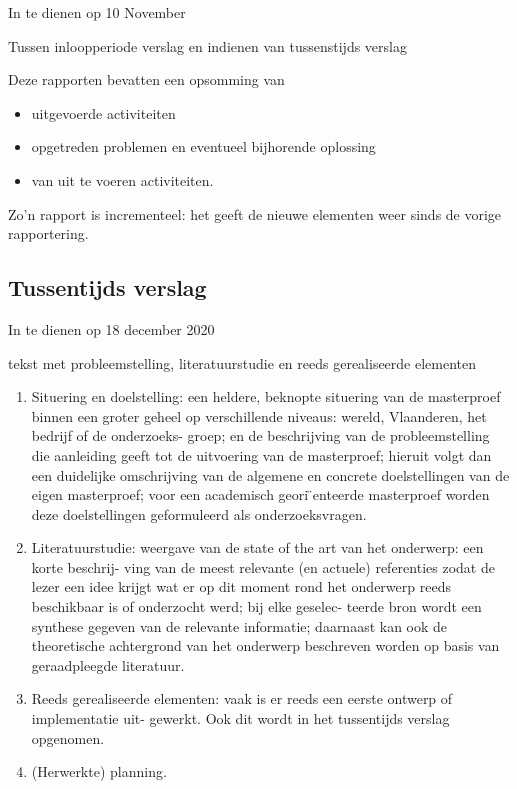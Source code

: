 \documentclass{scrartcl}
\begin{document}
In te dienen op 10 November



Tussen inloopperiode verslag en indienen van tussenstijds verslag

Deze rapporten bevatten een opsomming van 

\begin{itemize}
\item uitgevoerde activiteiten
\item opgetreden problemen en eventueel bijhorende oplossing
\item van uit te voeren activiteiten.
\end{itemize}
Zo’n rapport is incrementeel: het geeft de nieuwe elementen weer sinds de vorige rapportering.



\subsection{Tussentijds verslag}

In te dienen op 18 december 2020



tekst met probleemstelling, literatuurstudie en reeds gerealiseerde elementen

\begin{enumerate}[1]
\item Situering en doelstelling: een heldere, beknopte situering van de masterproef binnen een groter geheel op verschillende niveaus: wereld, Vlaanderen, het bedrijf of de onderzoeks- groep; en de beschrijving van de probleemstelling die aanleiding geeft tot de uitvoering van de masterproef; hieruit volgt dan een duidelijke omschrijving van de algemene en concrete doelstellingen van de eigen masterproef; voor een academisch geori ̈enteerde masterproef worden deze doelstellingen geformuleerd als onderzoeksvragen.
\item Literatuurstudie: weergave van de state of the art van het onderwerp: een korte beschrij- ving van de meest relevante (en actuele) referenties zodat de lezer een idee krijgt wat er op dit moment rond het onderwerp reeds beschikbaar is of onderzocht werd; bij elke geselec- teerde bron wordt een synthese gegeven van de relevante informatie; daarnaast kan ook de theoretische achtergrond van het onderwerp beschreven worden op basis van geraadpleegde literatuur.
\item Reeds gerealiseerde elementen: vaak is er reeds een eerste ontwerp of implementatie uit- gewerkt. Ook dit wordt in het tussentijds verslag opgenomen.
\item (Herwerkte) planning.
\end{enumerate}
\end{document}
